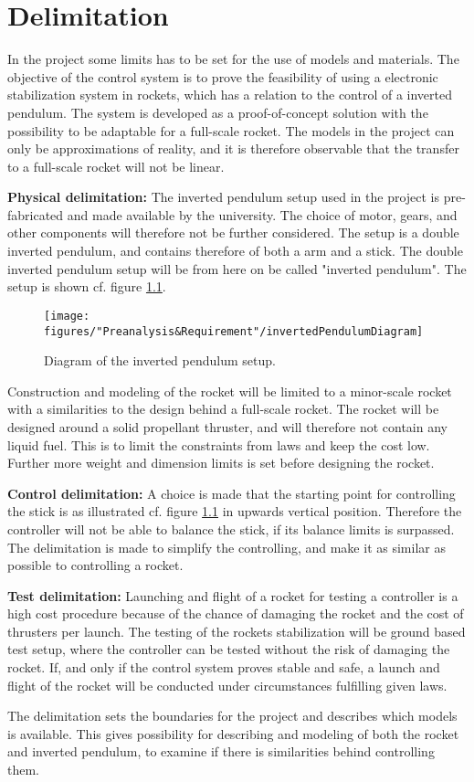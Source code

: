 \chapter{Delimitation}
In the project some limits has to be set for the use of models and materials. The objective of the control system is to prove the feasibility of using a electronic stabilization system in rockets, which has a relation to the control of a inverted pendulum. The system is developed as a proof-of-concept solution with the possibility to be adaptable for a full-scale rocket. The models in the project can only be approximations of reality, and it is therefore observable that the transfer to a full-scale rocket will not be linear.        

\textbf{Physical delimitation:}
The inverted pendulum setup used in the project is pre-fabricated and made available by the university.  The choice of motor, gears, and other components will therefore not be further considered. The setup is a double inverted pendulum, and contains therefore of both a arm and a stick. The double inverted pendulum setup will be from here on be called "inverted pendulum". The setup is shown cf. figure \ref{fig:InvertedPendulum1}.
\begin{figure}[htbp]
	\centering
	\texttt{[image: figures/"Preanalysis\&Requirement"/invertedPendulumDiagram]}
	\caption{Diagram of the inverted pendulum setup.} \label{fig:InvertedPendulum1}
\end{figure}


Construction and modeling of the rocket will be limited to a minor-scale rocket with a similarities to the design behind a full-scale rocket. The rocket will be designed around a solid propellant thruster, and will therefore not contain any liquid fuel. This is to limit the constraints from laws and keep the cost low. Further more weight and dimension limits is set before designing the rocket.
 
 
\textbf{Control delimitation:}
A choice is made that the starting point for controlling the stick is as illustrated cf. figure \ref{fig:InvertedPendulum1} in upwards vertical position. Therefore the controller will not be able to balance the stick, if its balance limits is surpassed. The delimitation is made to simplify the controlling, and make it as similar as possible to controlling a rocket. 
 
 
\textbf{Test delimitation:}
Launching and flight of a rocket for testing a controller is a high cost procedure because of the chance of damaging the rocket and the cost of thrusters per launch. The testing of the rockets stabilization will be ground based test setup, where the controller can be tested without the risk of damaging the rocket. If, and only if the control system proves stable and safe, a launch and flight of the rocket will be conducted under circumstances fulfilling given laws.   
\bigbreak


The delimitation sets the boundaries for the project and describes which models is available. This gives possibility for describing and modeling of both the rocket and inverted pendulum, to examine if there is similarities behind controlling them. 